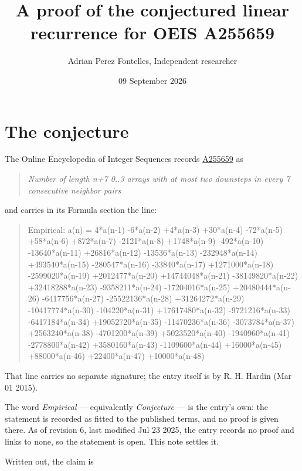 \documentclass[11pt]{article}
\title{A proof of the conjectured linear recurrence for OEIS A255659}
\author{Adrian Perez Fontelles, Independent researcher}
\date{09 September 2026}
\theoremstyle{definition}
\begin{document}
\maketitle
\section{The conjecture}

The Online Encyclopedia of Integer Sequences records \href{https://oeis.org/A255659}{A255659} as

\begin{quote}\itshape Number of length n+7 0..3 arrays with at most two downsteps in every 7 consecutive neighbor pairs\end{quote}

and carries in its Formula section the line:

\begin{quote}\ttfamily Empirical: a(n) = 4*a(n-1) -6*a(n-2) +4*a(n-3) +30*a(n-4) -72*a(n-5) +58*a(n-6) +872*a(n-7) -2121*a(n-8) +1748*a(n-9) -492*a(n-10) -13640*a(n-11) +26816*a(n-12) -13536*a(n-13) -232948*a(n-14) +493540*a(n-15) -280547*a(n-16) -33840*a(n-17) +1271000*a(n-18) -2599020*a(n-19) +2012477*a(n-20) +14744048*a(n-21) -38149820*a(n-22) +32418288*a(n-23) -9358211*a(n-24) -17204016*a(n-25) +20480444*a(n-26) -6417756*a(n-27) -25522136*a(n-28) +31264272*a(n-29) -10417774*a(n-30) -104220*a(n-31) +17617480*a(n-32) -9721216*a(n-33) -6417184*a(n-34) +19052720*a(n-35) -11470236*a(n-36) -3073784*a(n-37) +2563240*a(n-38) -4701200*a(n-39) +5023520*a(n-40) -1940960*a(n-41) -2778800*a(n-42) +3580160*a(n-43) -1109600*a(n-44) +16000*a(n-45) +88000*a(n-46) +22400*a(n-47) +10000*a(n-48)\end{quote}

That line carries no separate signature; the entry itself is by R. H. Hardin (Mar 01 2015).

The word {\itshape Empirical} --- equivalently {\itshape Conjecture} --- is the entry's own: the statement is recorded as fitted to the published terms, and no proof is given there. As of revision 6, last modified Jul 23 2025, the entry records no proof and links to none, so the statement is open. This note settles it.

Written out, the claim is
\end{document}
